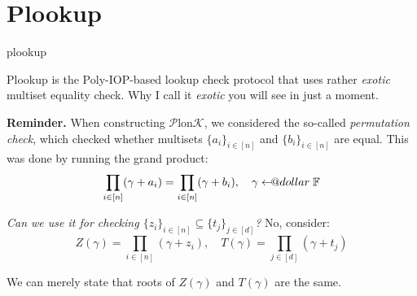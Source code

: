 \documentclass{zkdl-presentation-template}
\makeatletter
\newcommand\leftarrowS{\leftarrow\joinrel\smalldollar}
\newcommand{\smalldollar}{\mathrel{\mathpalette\small@dollar\relax}}
\newcommand{\small@dollar}[2]{%
  \vcenter{\hbox{%
    $#1\textnormal{\fontsize{0.7\dimexpr\f@size pt}{0}\selectfont\$}$%
  }}%
}
\makeatother
\begin{document}
    \section{Plookup}

    \begin{frame}{plookup}
        \begin{definition}
            Plookup is the Poly-IOP-based lookup check protocol that uses rather
            \textit{exotic} multiset equality check. Why I call it
            \textit{exotic} you will see in just a moment.
        \end{definition}

        \textbf{Reminder.} When constructing $\mathcal{P}$lon$\mathcal{K}$, we considered the
        so-called \textit{permutation check}, which checked whether
        multisets $\{a_i\}_{i \in [n]}$ and $\{b_i\}_{i \in [n]}$ are equal.\hspace{1.0px} This was done by running 
        the grand product:
        \begin{equation*}
            \prod_{i \in [n]} (\gamma+a_i) = \prod_{i \in [n]}(\gamma+b_i), \quad \gamma \leftarrowS \mathbb{F}
        \end{equation*}

        \vspace{-15px}

        \textit{Can we use it for checking $\{z_i\}_{i\in [n]} \subseteq
        \{t_j\}_{j \in [d]}$?}\hspace{1.0px} No, consider:
        \begin{equation*}
            Z(\gamma) = \prod_{i \in [n]} (\gamma + z_i), \quad T(\gamma) = \prod_{j \in [d]} (\gamma + t_j)
        \end{equation*}

        \vspace{-15px}

        We can merely state that roots of $Z(\gamma)$ and $T(\gamma)$ are the
        same.
    \end{frame}
\end{document}
